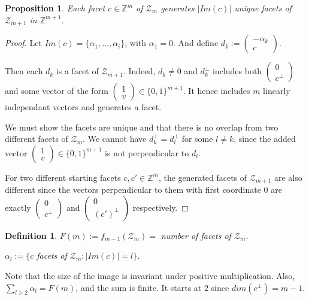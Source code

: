\documentclass[12pt]{report}
\newtheorem*{proposition}{Proposition}
\newtheorem*{definition}{Definition}
\newcommand{\Z}{\mathbb{Z}}
\newcommand{\mZ}{\mathcal{Z}}
\begin{document}
\begin{proposition}
Each facet $c \in \Z^m$ of $\mZ_m$ generates $| Im (c) |$ unique facets of $\mZ_{m+1}$ in $\Z^{m+1}$.
\end{proposition}
\begin{proof}
Let $Im(c) = \{ \alpha_1, \dots, \alpha_i \}$, with $\alpha_1=0$. And define $d_k := \begin{pmatrix} - \alpha_k \\ c \end{pmatrix}$.

Then each $d_k$ is a facet of $\mZ_{m+1}$. Indeed, $d_k \neq 0$ and $d_k^\perp$ includes both $\begin{pmatrix} 0 \\ c^\perp \end{pmatrix}$ and some vector of the form $\begin{pmatrix} 1 \\ v \end{pmatrix} \in \{0, 1\}^{m+1}$. It hence includes $m$ linearly independant vectors and generates a facet.

We must show the facets are unique and that there is no overlap from two different facets of $\mZ_m$. We cannot have $d_k^\perp = d_l^\perp$ for some $l \neq k$, since the added vector $\begin{pmatrix} 1 \\ v \end{pmatrix} \in \{0, 1\}^{m+1}$ is not perpendicular to $d_l$.

For two different starting facets $c, c' \in \Z^m$, the generated facets of $\mZ_{m+1}$ are also different since the vectors perpendicular to them with first coordinate 0 are exactly $\begin{pmatrix} 0 \\ c^\perp \end{pmatrix}$ and $\begin{pmatrix} 0 \\ (c')^\perp \end{pmatrix}$ respectively. 
\end{proof}

\begin{definition}
$F(m) :=  f_{m-1}(\mZ_m) = $ number of facets of $\mZ_m$.

$\alpha_l := \{ c$ facets of $\mZ_m : |Im(c)| = l \}$.
\end{definition}

Note that the size of the image is invariant under positive multiplication. Also, $\sum_{l \geq 2} \alpha_l = F(m)$, and the sum is finite. It starts at $2$ since $dim(c^\perp) = m-1$.
\end{document}
